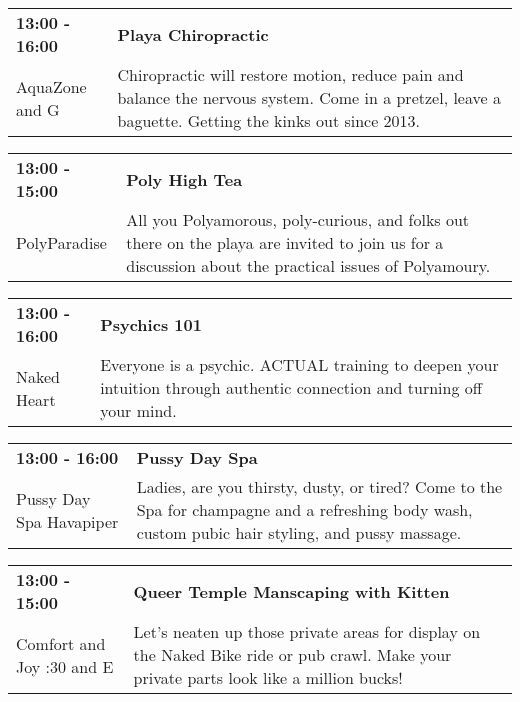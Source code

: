 \begin{tabular}{ p{1in} p{2.2in} }
    \textbf{13:00 - 16:00} & \textbf{Playa Chiropractic} \\
    AquaZone \newline 3 and G & Chiropractic will restore motion, reduce pain and balance the nervous system.  Come in a pretzel, leave a baguette. Getting the kinks out since 2013. \\
    \hline 
\end{tabular}
    
\begin{tabular}{ p{1in} p{2.2in} }
    \textbf{13:00 - 15:00} & \textbf{Poly High Tea} \\
    PolyParadise \newline  & All you Polyamorous, poly-curious, and folks out there on the playa are invited to join us for a discussion about the practical issues of Polyamoury. \\
    \hline 
\end{tabular}
    
\begin{tabular}{ p{1in} p{2.2in} }
    \textbf{13:00 - 16:00} & \textbf{Psychics 101} \\
    Naked Heart \newline  & Everyone is a psychic. ACTUAL training to deepen your intuition through authentic connection and turning off your mind. \\
    \hline 
\end{tabular}
    
\begin{tabular}{ p{1in} p{2.2in} }
    \textbf{13:00 - 16:00} & \textbf{Pussy Day Spa} \\
    Pussy Day Spa \newline Havapiper & Ladies, are you thirsty, dusty, or tired? Come to the Spa for champagne and a refreshing body wash, custom pubic hair styling, and pussy massage. \\
    \hline 
\end{tabular}
    
\begin{tabular}{ p{1in} p{2.2in} }
    \textbf{13:00 - 15:00} & \textbf{Queer Temple Manscaping with Kitten} \\
    Comfort and Joy \newline 7:30 and E & Let's neaten up those private areas for display on the Naked Bike ride or pub crawl. Make your private parts look like a million bucks! \\
    \hline 
\end{tabular}
    
